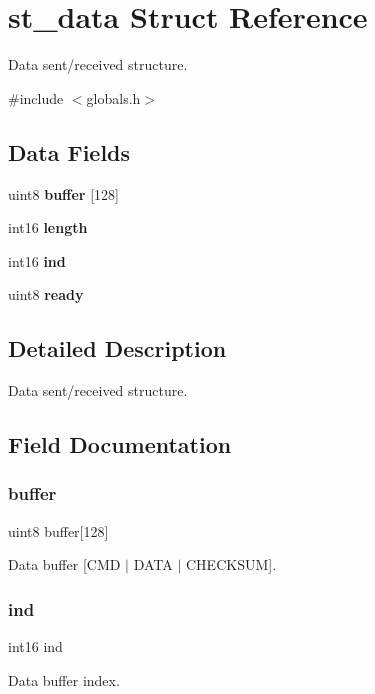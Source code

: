 \section{st\+\_\+data Struct Reference}
\label{structst__data}


Data sent/received structure.  




{\ttfamily \#include $<$globals.\+h$>$}

\subsection*{Data Fields}
\begin{DoxyCompactItemize}
\item 
uint8 \textbf{ buffer} [128]
\item 
int16 \textbf{ length}
\item 
int16 \textbf{ ind}
\item 
uint8 \textbf{ ready}
\end{DoxyCompactItemize}


\subsection{Detailed Description}
Data sent/received structure. 



\subsection{Field Documentation}
\mbox{\label{structst__data_ae690fc5f3d08456a861f43937912613d}} 
\subsubsection{buffer}
{\footnotesize\ttfamily uint8 buffer[128]}

Data buffer [C\+MD $\vert$ D\+A\+TA $\vert$ C\+H\+E\+C\+K\+S\+UM]. \mbox{\label{structst__data_a5d76dba8ca72d027d149ffcf8760f2ca}} 
\subsubsection{ind}
{\footnotesize\ttfamily int16 ind}

Data buffer index. \mbox{\label{structst__data_a3fb0e45fa764ccedd2dd8c0654c2e743}} 
